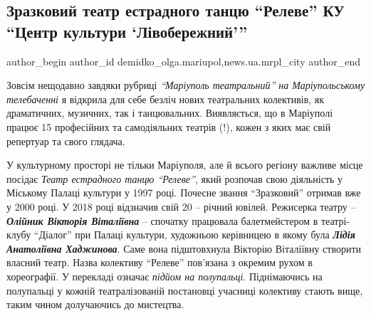  
 
 
 
 
 
\subsection{Зразковий театр естрадного танцю \enquote{Релеве} КУ \enquote{Центр культури \enquote{Лівобережний}}}
\label{sec:01_03_2021.stz.news.ua.mrpl_city.1.zrazk_teatr_tancu_releve}
 
\ifcmt
 author_begin
   author_id demidko_olga.mariupol,news.ua.mrpl_city
 author_end
\fi

Зовсім нещодавно завдяки рубриці \emph{\enquote{Маріуполь театральний} на Маріупольському
телебаченні} я відкрила для себе безліч нових театральних колективів, як
драматичних, музичних, так і танцювальних. Виявляється, що в Маріуполі працює
15 професійних та самодіяльних театрів (!), кожен з яких має свій репертуар та
свого глядача.


У культурному просторі не тільки Маріуполя, але й всього регіону важливе місце
посідає \emph{Театр естрадного танцю \enquote{Релеве}}, який  розпочав свою діяльність у
Міському Палаці культури у 1997 році. Почесне звання \enquote{Зразковий} отримав вже  у
2000 році. У 2018 році відзначив свій 20 – річний ювілей. Режисерка театру –
\emph{\textbf{Олійник Вікторія Віталіївна}} – спочатку працювала балетмейстером в театрі-клубу
\enquote{Діалог} при Палаці культури, художньою керівницею в якому була \emph{\textbf{Лідія
Анатоліївна Хаджинова}}. Саме вона підштовхнула Вікторію Віталіївну створити
власний театр. Назва колективу \enquote{Релеве} пов'язана з окремим рухом в
хореографії. У перекладі означає \emph{підйом на полупальці}. Піднімаючись на
полупальці у кожній театралізованій постановці учасниці колективу стають вище,
таким чином долучаючись до мистецтва.


